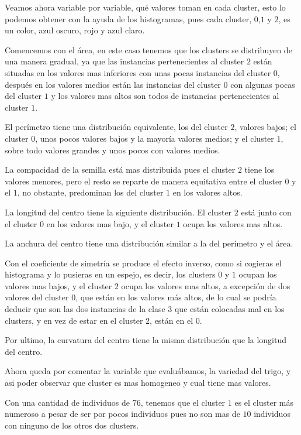 \documentclass[a4paper, 11pt, twoside, openany, onecolumn, final]{memoir}
\begin{document}
Veamos ahora variable por variable, qué valores toman en cada cluster, esto lo podemos obtener con la ayuda de los histogramas, pues cada cluster, $0$,$1$ y $2$, es un color, azul oscuro, rojo y azul claro.

	Comencemos con el área, en este caso tenemos que los clusters se distribuyen de una manera gradual, ya que las instancias pertenecientes al cluster $2$ están situadas en los valores mas inferiores con unas pocas instancias del cluster $0$, después en los valores medios están las instancias del cluster $0$ con algunas pocas del cluster $1$ y los valores mas altos son todos de instancias pertenecientes al cluster $1$.
	
	El perímetro tiene una distribución equivalente, los del cluster $2$, valores bajos; el cluster $0$, unos pocos valores bajos y la mayoría valores medios; y el cluster $1$, sobre todo valores grandes y unos pocos con valores medios.
	
	La compacidad de la semilla está mas distribuida pues el cluster $2$ tiene los valores menores, pero el resto se reparte de manera equitativa entre el cluster $0$ y el $1$, no obstante, predominan los del cluster $1$ en los valores altos.
	
	La longitud del centro tiene la siguiente distribución. El cluster $2$ está junto con el cluster $0$ en los valores mas bajo, y el cluster $1$ ocupa los valores mas altos. 
	
	La anchura del centro tiene una distribución similar a la del perímetro y el área.
	
	Con el coeficiente de simetría se produce el efecto inverso, como si cogieras el histograma y lo pusieras en un espejo, es decir, los clusters $0$ y $1$ ocupan los valores mas bajos, y el cluster $2$ ocupa los valores mas altos, a excepción de dos valores del cluster $0$, que están en los valores más altos, de lo cual se podría deducir que son las dos instancias de la clase $3$ que están colocadas mal en los clusters, y en vez de estar en el cluster $2$, están en el $0$.  
	
	Por ultimo, la curvatura del centro tiene la misma distribución que la longitud del centro.

Ahora queda por comentar la variable que evaluábamos, la variedad del trigo, y asi poder observar que cluster es mas homogeneo y cual tiene mas valores.

Con una cantidad de individuos de $76$, tenemos que el cluster $1$ es el cluster más numeroso a pesar de ser por pocos individuos pues no son mas de $10$ individuos con ninguno de los otros dos clusters.
\end{document}
